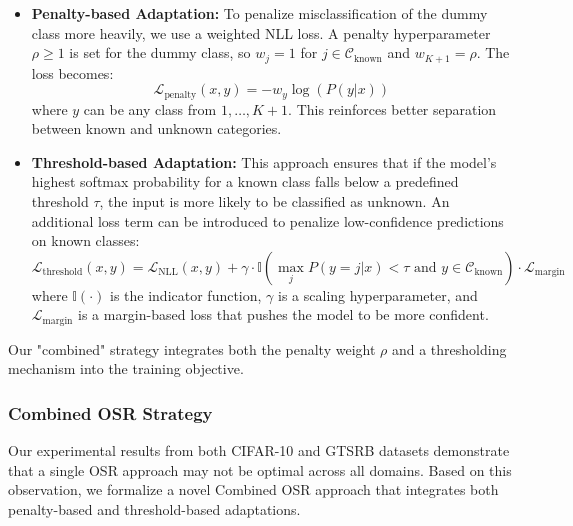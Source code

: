 \documentclass[11pt, a4paper]{article}
\begin{document}
\begin{itemize}
    \item \textbf{Penalty-based Adaptation:} To penalize misclassification of the dummy class more heavily, we use a weighted NLL loss. A penalty hyperparameter $\rho \ge 1$ is set for the dummy class, so $w_j = 1$ for $j \in \mathcal{C}_{\text{known}}$ and $w_{K+1} = \rho$. The loss becomes:
    \begin{equation}
        \mathcal{L}_{\text{penalty}}(x, y) = -w_y \log(P(y|x))
    \end{equation}
    where $y$ can be any class from $1, \dots, K+1$. This reinforces better separation between known and unknown categories.
    \item \textbf{Threshold-based Adaptation:} This approach ensures that if the model's highest softmax probability for a known class falls below a predefined threshold $\tau$, the input is more likely to be classified as unknown. An additional loss term can be introduced to penalize low-confidence predictions on known classes:
    \begin{equation}
        \mathcal{L}_{\text{threshold}}(x, y) = \mathcal{L}_{\text{NLL}}(x,y) + \gamma \cdot \mathbb{I}(\max_j P(y=j|x) < \tau \text{ and } y \in \mathcal{C}_{\text{known}}) \cdot \mathcal{L}_{\text{margin}}
    \end{equation}
    where $\mathbb{I}(\cdot)$ is the indicator function, $\gamma$ is a scaling hyperparameter, and $\mathcal{L}_{\text{margin}}$ is a margin-based loss that pushes the model to be more confident.
\end{itemize}
Our "combined" strategy integrates both the penalty weight $\rho$ and a thresholding mechanism into the training objective.

\subsubsection{Combined OSR Strategy}
Our experimental results from both CIFAR-10 and GTSRB datasets demonstrate that a single OSR approach may not be optimal across all domains. Based on this observation, we formalize a novel Combined OSR approach that integrates both penalty-based and threshold-based adaptations.
\end{document}
